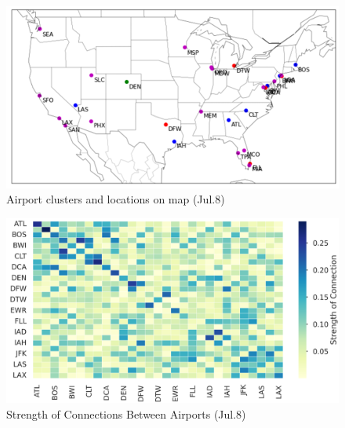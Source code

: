 \begin{figure}[thbp]
    \label{fig:4-1}
    \centering
    \includegraphics[width=\textwidth]{img/map of cluster.png}
    \caption{Airport clusters and locations on map (Jul.8)}
\end{figure}

\begin{figure}[t!]
    \label{fig:4-2}
    \centering
    \includegraphics[width=\textwidth]{img/adjacency.png}
    \caption{Strength of Connections Between Airports (Jul.8)}
\end{figure}

